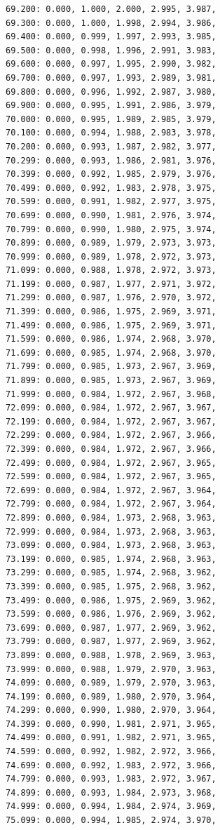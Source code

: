 \documentclass[12pt, a4paper]{article}
\begin{document}
\begin{scriptsize}
\begin{ttfamily}
\begin{lstlisting}
69.200: 0.000, 1.000, 2.000, 2.995, 3.987, 
69.300: 0.000, 1.000, 1.998, 2.994, 3.986, 
69.400: 0.000, 0.999, 1.997, 2.993, 3.985, 
69.500: 0.000, 0.998, 1.996, 2.991, 3.983, 
69.600: 0.000, 0.997, 1.995, 2.990, 3.982, 
69.700: 0.000, 0.997, 1.993, 2.989, 3.981, 
69.800: 0.000, 0.996, 1.992, 2.987, 3.980, 
69.900: 0.000, 0.995, 1.991, 2.986, 3.979, 
70.000: 0.000, 0.995, 1.989, 2.985, 3.979, 
70.100: 0.000, 0.994, 1.988, 2.983, 3.978, 
70.200: 0.000, 0.993, 1.987, 2.982, 3.977, 
70.299: 0.000, 0.993, 1.986, 2.981, 3.976, 
70.399: 0.000, 0.992, 1.985, 2.979, 3.976, 
70.499: 0.000, 0.992, 1.983, 2.978, 3.975, 
70.599: 0.000, 0.991, 1.982, 2.977, 3.975, 
70.699: 0.000, 0.990, 1.981, 2.976, 3.974, 
70.799: 0.000, 0.990, 1.980, 2.975, 3.974, 
70.899: 0.000, 0.989, 1.979, 2.973, 3.973, 
70.999: 0.000, 0.989, 1.978, 2.972, 3.973, 
71.099: 0.000, 0.988, 1.978, 2.972, 3.973, 
71.199: 0.000, 0.987, 1.977, 2.971, 3.972, 
71.299: 0.000, 0.987, 1.976, 2.970, 3.972, 
71.399: 0.000, 0.986, 1.975, 2.969, 3.971, 
71.499: 0.000, 0.986, 1.975, 2.969, 3.971, 
71.599: 0.000, 0.986, 1.974, 2.968, 3.970, 
71.699: 0.000, 0.985, 1.974, 2.968, 3.970, 
71.799: 0.000, 0.985, 1.973, 2.967, 3.969, 
71.899: 0.000, 0.985, 1.973, 2.967, 3.969, 
71.999: 0.000, 0.984, 1.972, 2.967, 3.968, 
72.099: 0.000, 0.984, 1.972, 2.967, 3.967, 
72.199: 0.000, 0.984, 1.972, 2.967, 3.967, 
72.299: 0.000, 0.984, 1.972, 2.967, 3.966, 
72.399: 0.000, 0.984, 1.972, 2.967, 3.966, 
72.499: 0.000, 0.984, 1.972, 2.967, 3.965, 
72.599: 0.000, 0.984, 1.972, 2.967, 3.965, 
72.699: 0.000, 0.984, 1.972, 2.967, 3.964, 
72.799: 0.000, 0.984, 1.972, 2.967, 3.964, 
72.899: 0.000, 0.984, 1.973, 2.968, 3.963, 
72.999: 0.000, 0.984, 1.973, 2.968, 3.963, 
73.099: 0.000, 0.984, 1.973, 2.968, 3.963, 
73.199: 0.000, 0.985, 1.974, 2.968, 3.963, 
73.299: 0.000, 0.985, 1.974, 2.968, 3.962, 
73.399: 0.000, 0.985, 1.975, 2.968, 3.962, 
73.499: 0.000, 0.986, 1.975, 2.969, 3.962, 
73.599: 0.000, 0.986, 1.976, 2.969, 3.962, 
73.699: 0.000, 0.987, 1.977, 2.969, 3.962, 
73.799: 0.000, 0.987, 1.977, 2.969, 3.962, 
73.899: 0.000, 0.988, 1.978, 2.969, 3.963, 
73.999: 0.000, 0.988, 1.979, 2.970, 3.963, 
74.099: 0.000, 0.989, 1.979, 2.970, 3.963, 
74.199: 0.000, 0.989, 1.980, 2.970, 3.964, 
74.299: 0.000, 0.990, 1.980, 2.970, 3.964, 
74.399: 0.000, 0.990, 1.981, 2.971, 3.965, 
74.499: 0.000, 0.991, 1.982, 2.971, 3.965, 
74.599: 0.000, 0.992, 1.982, 2.972, 3.966, 
74.699: 0.000, 0.992, 1.983, 2.972, 3.966, 
74.799: 0.000, 0.993, 1.983, 2.972, 3.967, 
74.899: 0.000, 0.993, 1.984, 2.973, 3.968, 
74.999: 0.000, 0.994, 1.984, 2.974, 3.969, 
75.099: 0.000, 0.994, 1.985, 2.974, 3.970, 

\end{lstlisting}
\end{ttfamily}
\end{scriptsize}
\end{document}

